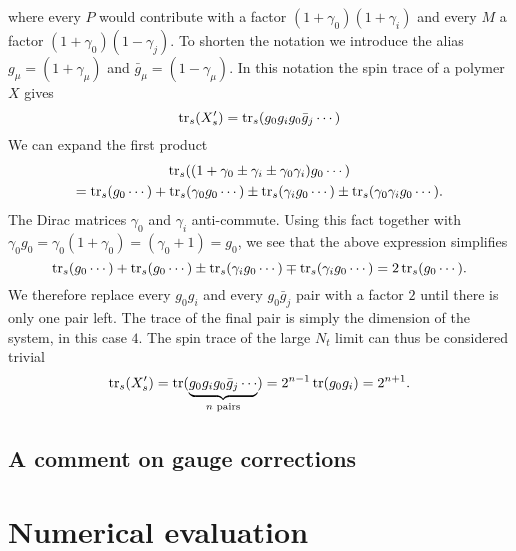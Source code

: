 %
where every $P$ would contribute with a factor $(1+\gamma_0)(1+\gamma_i)$ and
every $M$ a factor $(1+\gamma_0)(1-\gamma_j)$. To shorten the notation we
introduce the alias $g_{\mu} = (1+\gamma_{\mu})$ and $\bar{g}_{\mu} =
(1-\gamma_{\mu})$. In this notation the spin trace of a polymer $X$ gives
%
\begin{equation}
  \operatorname{tr}_s (X'_s) = \operatorname{tr}_s(g_0 g_i g_0 \bar{g}_j \cdots)
\end{equation}
%
We can expand the first product
%
\begin{multline}
  \operatorname{tr}_s((1 + \gamma_0 \pm \gamma_i \pm \gamma_0 \gamma_i)g_0  \cdots) \\
    = \operatorname{tr}_s(g_0 \cdots) + \operatorname{tr}_s(\gamma_0g_0 \cdots)
    \pm \operatorname{tr}_s(\gamma_i g_0 \cdots) \pm \operatorname{tr}_s(\gamma_0\gamma_ig_0 \cdots).
\end{multline}
%
The Dirac matrices $\gamma_0$ and $\gamma_i$ anti-commute. Using this fact
together with $\gamma_0 g_0 = \gamma_0(1+\gamma_0) = (\gamma_0+1) = g_0$, we see
that the above expression simplifies
%
\begin{equation}
  \operatorname{tr}_s(g_0 \cdots) + \operatorname{tr}_s( g_0 \cdots )
    \pm \operatorname{tr}_s(\gamma_i g_0 \cdots ) \mp \operatorname{tr}_s(\gamma_i g_0 \cdots )
    = 2 \operatorname{tr}_s( g_0 \cdots ) .
\end{equation}
%
We therefore replace every $g_0 g_i$ and every $g_0 \bar{g}_j$ pair with a
factor $2$ until there is only one pair left. The trace of the final pair is
simply the dimension of the system, in this case $4$. The spin trace of the
large $N_t$ limit can thus be considered trivial
%
\begin{equation}
  \operatorname{tr}_s(X'_s) = \operatorname{tr} ( \underbrace{g_0 g_i g_0 \bar{g}_j \cdots}_{n \text{ pairs}})
   = 2^{n-1} \operatorname{tr}(g_0 g_i) = 2^{n+1}.
\end{equation}

\subsection{A comment on gauge corrections}

\section{Numerical evaluation}
